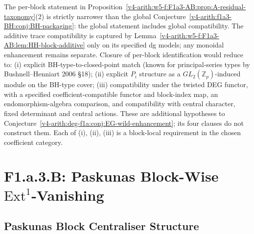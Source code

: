 \begin{remark}
\label{v4-arith:w5-f:F1a3-AB:rem:per-block-narrower}
The per-block statement in
Proposition~\ref{v4-arith:w5-f:F1a3-AB:prop:A-residual-taxonomy}(2) is
strictly narrower than the global
Conjecture~\ref{v4-arith:f1a3-BH:conj:BH-packaging}: the global statement
includes global compatibility. The additive trace compatibility is
captured by Lemma~\ref{v4-arith:w5-f:F1a3-AB:lem:HH-block-additive}
only on its specified dg models; any monoidal enhancement remains
separate. Closure of
per-block identification would reduce to: (i) explicit
BH-type-to-closed-point match (known for principal-series types by
Bushnell--Henniart 2006 \S 18); (ii) explicit $P_i$
structure as a \(GL_{2}(\mathbb{Z}_{p})\)-induced module on the
BH-type cover; (iii) compatibility under the twisted DEG functor,
with a specified coefficient-compatible functor and block-index map,
an endomorphism-algebra comparison, and compatibility with central
character, fixed determinant and central actions. These are additional
hypotheses to Conjecture~\ref{v4-arith:deg-f1a:conj:EG-wild-enhancement};
its four clauses do not construct them. Each of (i), (ii), (iii)
is a block-local requirement in the chosen coefficient category.
\end{remark}

\section{F1.a.3.B: Paskunas Block-Wise \(\mathrm{Ext}^{1}\)-Vanishing}
\label{v4-arith:w5-f:F1a3-AB:B-Paskunas}

\subsection{Paskunas Block Centraliser Structure}

